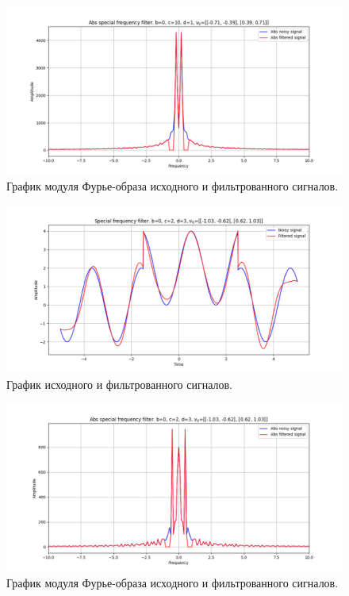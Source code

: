 \documentclass[a4paper, 12pt]{article}
\begin{document}
    \begin{figure}[!htb]
        \centering
        \includegraphics[scale=0.485]{3_abs_u_U_nospec.png}
        \captionsetup{skip=0pt}
        \caption{График модуля Фурье-образа исходного и фильтрованного сигналов.}
        \label{fig:fig84}
    \end{figure}
    \begin{figure}[!htb]
        \centering
        \includegraphics[scale=0.485]{4_u_flt_u_nospec.png}
        \captionsetup{skip=0pt}
        \caption{График исходного и фильтрованного сигналов.}
        \label{fig:fig85}
    \end{figure}
    \begin{figure}[!htb]
        \centering
        \includegraphics[scale=0.485]{4_abs_u_U_nospec.png}
        \captionsetup{skip=0pt}
        \caption{График модуля Фурье-образа исходного и фильтрованного сигналов.}
        \label{fig:fig86}
    \end{figure}
\end{document}
